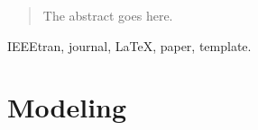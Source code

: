 \documentclass[journal]{IEEEtran}
\begin{document}







\maketitle


\begin{abstract}
The abstract goes here.
\end{abstract}

\begin{IEEEkeywords}
IEEEtran, journal, \LaTeX, paper, template.
\end{IEEEkeywords}






%
\IEEEpeerreviewmaketitle



\section{Modeling}
\end{document}
